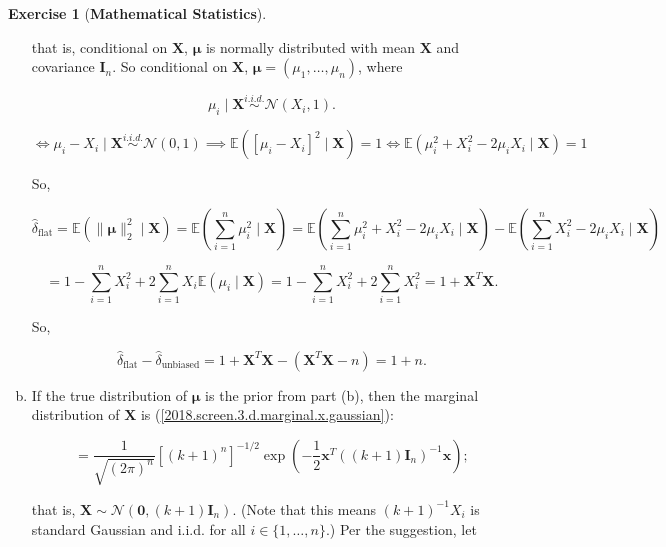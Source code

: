 \documentclass{article}
\theoremstyle{definition}
\newtheorem{exercise}{Exercise}
\theoremstyle{definition}
\theoremstyle{definition}
\theoremstyle{definition}
\theoremstyle{definition}
\newcommand{\E}{\mathbb{E}}
\begin{document}
\begin{exercise}[\textbf{Mathematical Statistics}]
\begin{enumerate}[(a)]
that is, conditional on \(\boldsymbol{X}\), \(\boldsymbol{\mu}\) is normally distributed with mean \(\boldsymbol{X}\) and covariance \(\boldsymbol{I}_n\). So  conditional on \(\boldsymbol{X}\), \(\boldsymbol{\mu} = (\mu_1, \ldots, \mu_n)\), where

\[
\mu_i  \mid \boldsymbol{X} \overset{i.i.d.}{\sim} \mathcal{N} \left(  X_i, 1 \right).
\]

\begin{equation}
 \iff  \mu_i -  X_i  \mid \boldsymbol{X} \overset{i.i.d.}{\sim} \mathcal{N} \left(0, 1\right)  \implies  \E \left( \left[ \mu_i -   X_i \right]^2  \mid \boldsymbol{X}  \right) = 1 \iff   \E \left(  \mu_i  ^2  + X_i^2 -  2\mu_i X_i  \mid \boldsymbol{X}  \right) = 1 
\end{equation}

So,

\[
\hat{\delta}_{\text{flat}} = \E \left( \lVert \boldsymbol{\mu} \rVert_2^2 \mid \boldsymbol{X} \right) = \E \left( \sum_{i=1}^n \mu_i^2 \mid \boldsymbol{X}  \right) = \E \left( \sum_{i=1}^n  \mu_i  ^2  + X_i^2 -  2\mu_i X_i  \mid \boldsymbol{X}  \right) -  \E \left( \sum_{i=1}^n  X_i^2 - 2 \mu_i X_i  \mid \boldsymbol{X}  \right)
\]

\[
= 1 -  \sum_{i=1}^n  X_i^2  + 2 \sum_{i=1}^n  X_i  \E \left( \mu_i  \mid \boldsymbol{X}  \right)  = 1 -  \sum_{i=1}^n  X_i^2  + 2 \sum_{i=1}^n  X_i^2  = 1 + \boldsymbol{X}^T\boldsymbol{X}.  
\]

So,

\begin{equation}\label{2018.screen.3.c.flat.unbiased.difference}
\hat{\delta}_{\text{flat}}  - \hat{\delta}_{\text{unbiased}} = 1 + \boldsymbol{X}^T\boldsymbol{X} - \left( \boldsymbol{X}^T\boldsymbol{X} - n \right) = 1 + n.
\end{equation}


\item If the true distribution of \(\boldsymbol{\mu}\) is the prior from part (b), then the marginal distribution of \(\boldsymbol{X}\) is (\ref{2018.screen.3.d.marginal.x.gaussian}):

\[
=\frac{1}{\sqrt{(2 \pi )^n}} \left[ \left( k+1 \right)^n \right]^{-1/2} \exp \left(- \frac{1}{2} \boldsymbol{x}^T \left( (k+1) \boldsymbol{I}_n \right)^{-1} \boldsymbol{x}   \right);
\]

that is, \(\boldsymbol{X} \sim \mathcal{N} (\boldsymbol{0}, (k+1)\boldsymbol{I}_n)\). (Note that this means \( (k+1)^{-1} X_i \) is standard Gaussian and i.i.d. for all \(i \in \{1, \ldots, n\}\).) Per the suggestion, let 


\end{enumerate}
\end{exercise}
\end{document}
